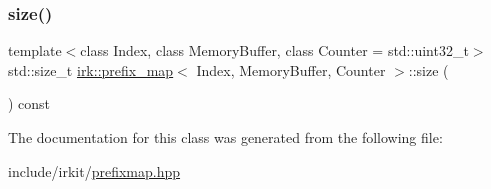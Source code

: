 \mbox{\label{classirk_1_1prefix__map_ad9055b6d6717495d9b61aa1865bd9a49}} 
\subsubsection{\texorpdfstring{size()}{size()}}
{\footnotesize\ttfamily template$<$class Index, class Memory\+Buffer, class Counter = std\+::uint32\+\_\+t$>$ \\
std\+::size\+\_\+t \mbox{\hyperlink{classirk_1_1prefix__map}{irk\+::prefix\+\_\+map}}$<$ Index, Memory\+Buffer, Counter $>$\+::size (\begin{DoxyParamCaption}{ }\end{DoxyParamCaption}) const\hspace{0.3cm}{\ttfamily [inline]}}



The documentation for this class was generated from the following file\+:\begin{DoxyCompactItemize}
\item 
include/irkit/\mbox{\hyperlink{prefixmap_8hpp}{prefixmap.\+hpp}}\end{DoxyCompactItemize}
